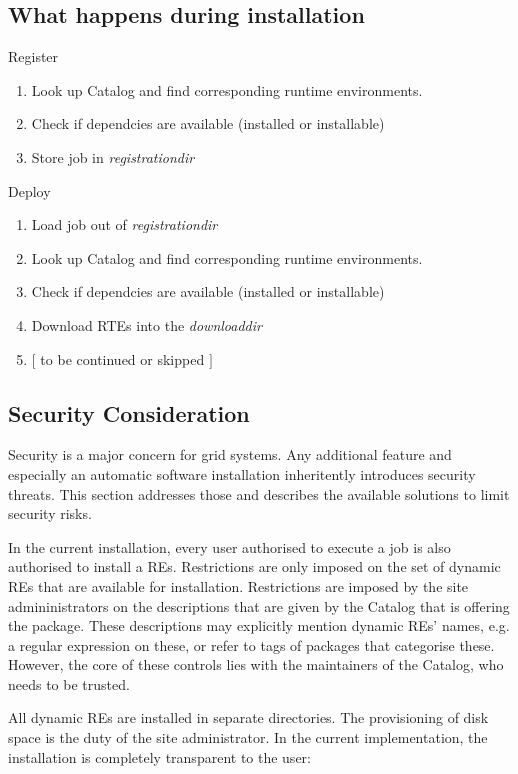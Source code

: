 \subsection{What happens during installation}

Register
\begin{enumerate}
 \item Look up Catalog and find corresponding runtime environments.
 \item Check if dependcies are available (installed or installable)
 \item Store job in \textit{registrationdir}
\end{enumerate}

Deploy
\begin{enumerate}
 \item Load job out of \textit{registrationdir}
 \item Look up Catalog and find corresponding runtime environments.
 \item Check if dependcies are available (installed or installable)
 \item Download RTEs into the \textit{downloaddir}
 \item $\lbrack$ to be continued or skipped $\rbrack$
\end{enumerate}

\subsection{Security Consideration}



Security is a major concern for grid systems. Any additional feature
and especially an automatic software
installation inheritently introduces security threats. This section
addresses those and describes the available solutions to limit
security risks.

In the current installation, every user authorised to execute a job is
also authorised to install a REs. Restrictions are
only imposed on the set of dynamic REs that are available for installation.
Restrictions are imposed by the site admininistrators on the descriptions
that are given by the Catalog that is offering the package. These
descriptions may explicitly mention dynamic REs' names, e.g. a regular expression on
these, or refer to tags of packages that categorise these. However,
the core of these controls lies with the maintainers of the Catalog,
who needs to be trusted.

All dynamic REs are installed in separate directories. The provisioning of
disk space is the duty of the site administrator.  In the current
implementation, the installation is completely transparent to the user:

